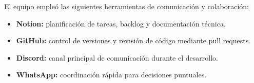 El equipo empleó las siguientes herramientas de comunicación y colaboración:

\begin{itemize}[leftmargin=1.5em]
  \item \textbf{Notion:} planificación de tareas, backlog y documentación técnica.
  \item \textbf{GitHub:} control de versiones y revisión de código mediante pull requests.
  \item \textbf{Discord:} canal principal de comunicación durante el desarrollo.
  \item \textbf{WhatsApp:} coordinación rápida para decisiones puntuales.
\end{itemize}